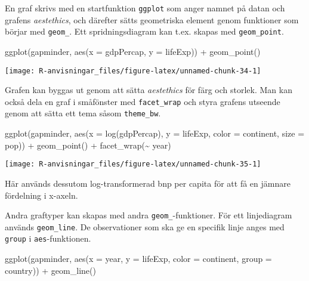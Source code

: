 \documentclass[
]{book}
\newenvironment{Shaded}{\begin{snugshade}}{\end{snugshade}}
\newcommand{\AttributeTok}[1]{\textcolor[rgb]{0.77,0.63,0.00}{#1}}
\newcommand{\FunctionTok}[1]{\textcolor[rgb]{0.00,0.00,0.00}{#1}}
\newcommand{\NormalTok}[1]{#1}
\newcommand{\SpecialCharTok}[1]{\textcolor[rgb]{0.00,0.00,0.00}{#1}}
\theoremstyle{definition}
\theoremstyle{definition}
\theoremstyle{definition}
\theoremstyle{definition}
\theoremstyle{remark}
\begin{document}
En graf skrivs med en startfunktion \texttt{ggplot} som anger namnet på datan och grafens \emph{aestethics}, och därefter sätts geometriska element genom funktioner som börjar med \texttt{geom\_}. Ett spridningsdiagram kan t.ex. skapas med \texttt{geom\_point}.

\begin{Shaded}
\begin{Highlighting}[]
\FunctionTok{ggplot}\NormalTok{(gapminder, }\FunctionTok{aes}\NormalTok{(}\AttributeTok{x =}\NormalTok{ gdpPercap, }\AttributeTok{y =}\NormalTok{ lifeExp)) }\SpecialCharTok{+}
  \FunctionTok{geom\_point}\NormalTok{()}
\end{Highlighting}
\end{Shaded}

\begin{center}\texttt{[image: R-anvisningar\_files/figure-latex/unnamed-chunk-34-1]} \end{center}

Grafen kan byggas ut genom att sätta \emph{aestethics} för färg och storlek. Man kan också dela en graf i småfönster med \texttt{facet\_wrap} och styra grafens utseende genom att sätta ett tema såsom \texttt{theme\_bw}.

\begin{Shaded}
\begin{Highlighting}[]
\FunctionTok{ggplot}\NormalTok{(gapminder, }\FunctionTok{aes}\NormalTok{(}\AttributeTok{x =} \FunctionTok{log}\NormalTok{(gdpPercap), }\AttributeTok{y =}\NormalTok{ lifeExp, }\AttributeTok{color =}\NormalTok{ continent, }\AttributeTok{size =}\NormalTok{ pop)) }\SpecialCharTok{+}
  \FunctionTok{geom\_point}\NormalTok{() }\SpecialCharTok{+}
  \FunctionTok{facet\_wrap}\NormalTok{(}\SpecialCharTok{\textasciitilde{}}\NormalTok{ year)}
\end{Highlighting}
\end{Shaded}

\begin{center}\texttt{[image: R-anvisningar\_files/figure-latex/unnamed-chunk-35-1]} \end{center}

Här används dessutom log-transformerad bnp per capita för att få en jämnare fördelning i x-axeln.

Andra graftyper kan skapas med andra \texttt{geom\_}-funktioner. För ett linjediagram används \texttt{geom\_line}. De observationer som ska ge en specifik linje anges med \texttt{group} i \texttt{aes}-funktionen.

\begin{Shaded}
\begin{Highlighting}[]
\FunctionTok{ggplot}\NormalTok{(gapminder, }\FunctionTok{aes}\NormalTok{(}\AttributeTok{x =}\NormalTok{ year, }\AttributeTok{y =}\NormalTok{ lifeExp, }\AttributeTok{color =}\NormalTok{ continent, }\AttributeTok{group =}\NormalTok{ country)) }\SpecialCharTok{+}
  \FunctionTok{geom\_line}\NormalTok{()}
\end{Highlighting}
\end{Shaded}
\end{document}
